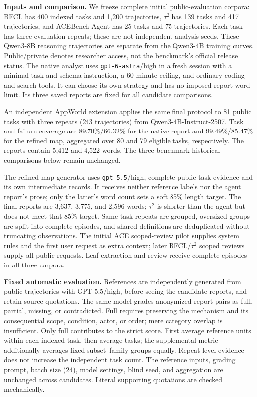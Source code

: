 \textbf{Inputs and comparison.}\quad
We freeze complete initial public-evaluation corpora: BFCL has 400 indexed tasks
and 1,200 trajectories, $\tau^2$ has 139 tasks and 417 trajectories, and
ACEBench-Agent has 25 tasks and 75 trajectories. Each task has three evaluation
repeats; these are not independent analysis seeds. These Qwen3-8B reasoning
trajectories are separate from the Qwen3-4B training curves. Public/private
denotes researcher access, not the benchmark's official release status.
The native analyst uses \texttt{gpt-6-astra}/high in a fresh session with a
minimal task-and-schema instruction, a 60-minute ceiling, and ordinary coding
and search tools. It can choose its own strategy and has no imposed report word
limit. Its three saved reports are fixed for all candidate comparisons.

An independent AppWorld extension applies the same final protocol to 81 public
tasks with three repeats (243 trajectories) from Qwen3-4B-Instruct-2507.
Task and failure coverage are 89.70\%/66.32\% for the native report and
99.49\%/85.47\% for the refined map, aggregated over 80 and 79 eligible tasks,
respectively. The reports contain 5,412 and 4,522 words.
The three-benchmark historical comparisons below remain unchanged.

The refined-map generator uses \texttt{gpt-5.5}/high, complete public task
evidence and its own intermediate records. It receives neither reference labels
nor the agent report's prose; only the latter's word count sets a soft 85\%
length target. The final reports are 3,637, 3,775, and 2,596 words; $\tau^2$
is shorter than the agent but does not meet that 85\% target. Same-task repeats
are grouped, oversized groups are split into complete episodes, and shared
definitions are deduplicated without truncating observations. The initial ACE
scoped-review pilot supplies system rules and the first user request as extra
context; later BFCL/$\tau^2$ scoped reviews supply all public requests. Leaf
extraction and review receive complete episodes in all three corpora.

\textbf{Fixed automatic evaluation.}\quad
References are independently generated from public trajectories with
GPT-5.5/high, before seeing the candidate reports, and retain source quotations.
The same model grades anonymized report pairs as full, partial, missing, or
contradicted. Full requires preserving the mechanism and its consequential
scope, condition, actor, or order; mere category overlap is insufficient.
Only full contributes to the strict score. First average reference units within
each indexed task, then average tasks; the supplemental metric additionally
averages fixed subset--family groups equally. Repeat-level evidence does not
increase the independent task count. The reference inputs, grading prompt,
batch size (24), model settings, blind seed, and aggregation are unchanged
across candidates. Literal supporting quotations are checked mechanically.

